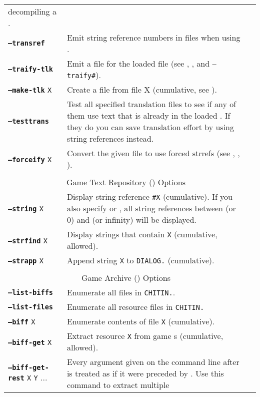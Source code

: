 \documentclass{article}
\def\ttref#1{\ahrefloc{#1}{\tt #1}}
\def\DEFINE#1{{\tt \bf #1}\label{#1}\index{#1}}
\def\t#1{{\tt #1}}
\begin{document}
\begin{tabular}{lp{10in}|p{10in}}
  decompiling a \ttref{DLG}.  \\
\DEFINE{--transref} &	Emit string reference numbers in \ttref{TRA} files
when using \ttref{--trans}. \\
\DEFINE{--traify-tlk} & Emit a \ttref{TRA} file for the loaded \ttref{TLK} file (see \ttref{--tlkin}, \ttref{--out}, \ttref{--min} and \t{--traify\#}). \\
\DEFINE{--make-tlk} \t{X} & Create a \ttref{TLK} file from \ttref{TRA} file X (cumulative, see \ttref{--tlkout}). \\
\DEFINE{--testtrans} &	Test all specified \ttref{TRA} translation files to
see if any of them use text that is already in the loaded
\ttref{DIALOG.TLK}. If they do you can save translation effort by using
string references instead. \\
\DEFINE{--forceify} \t{X} & Convert the given \ttref{D} file to use forced
strrefs (see \ttref{--out}, \ttref{SAY}, \ttref{Forced String Reference}). \\
\\
\multicolumn{2}{c}{ \color{red} Game Text Repository (\ttref{TLK}) Options} \\
\DEFINE{--string} \t{X}&	Display string reference {\tt \#X} (cumulative). If you also specify \ttref{--min} or \ttref{--max}, all string references between \ttref{--min} (or 0) and \ttref{--max} (or infinity) will be displayed. \\
\DEFINE{--strfind} \t{X}&	Display strings that contain {\tt X} (cumulative, \ttref{regexp} allowed). \\
\DEFINE{--strapp} \t{X}&	Append string \t{X} to \t{DIALOG.}\ttref{TLK} (cumulative). \\
\\
\multicolumn{2}{c}{ \color{red} Game Archive (\ttref{BIFF}) Options} \\
\DEFINE{--list-biffs}&	Enumerate all \ttref{BIFF} files in \t{CHITIN.}\ttref{KEY}. \\
\DEFINE{--list-files}&	Enumerate all resource files in \t{CHITIN.}\ttref{KEY} \\
\DEFINE{--biff} \t{X} & Enumerate contents of \ttref{BIFF} file \t{X} (cumulative). \\
\DEFINE{--biff-get} \t{X}&	Extract resource \t{X} from game \ttref{BIFF}s (cumulative, \ttref{regexp} allowed). \\
\DEFINE{--biff-get-rest} \t{X} \t{Y} ... & Every argument given on the
command line after \ttref{--biff-get-rest} is treated as if it were
preceded by \ttref{--biff-get}. Use this command to extract multiple

\end{tabular}
\end{document}
